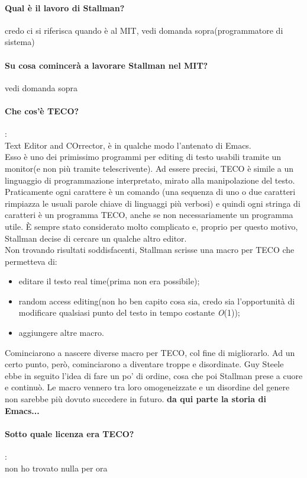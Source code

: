 \documentclass[a4paper]{article}
\begin{document}
		\paragraph{Qual è il lavoro di Stallman?}
		credo ci si riferisca quando è al MIT, vedi domanda sopra(programmatore di sistema)
		\paragraph{Su cosa comincerà a lavorare Stallman nel MIT?}
		vedi domanda sopra
		\paragraph{Che cos'è TECO?}: \\
		Text Editor and COrrector, è in qualche modo l'antenato di Emacs.\\
		Esso è uno dei primissimo programmi per editing di testo usabili tramite un monitor(e non più tramite telescrivente). Ad essere precisi, TECO è simile a un linguaggio di programmazione interpretato, mirato alla manipolazione del testo. Praticamente ogni carattere è un comando (una sequenza di uno o due caratteri rimpiazza le usuali parole chiave di linguaggi più verbosi) e quindi ogni stringa di caratteri è un programma TECO, anche se non necessariamente un programma utile. È sempre stato considerato molto complicato e, proprio per questo motivo, Stallman decise di cercare un qualche altro editor. \\
		Non trovando risultati soddisfacenti, Stallman scrisse una macro per TECO che permetteva di:
		\begin{itemize}
			\item editare il testo real time(prima non era possibile);
			\item random access editing(non ho ben capito cosa sia, credo sia l'opportunità di modificare qualsiasi punto del testo in tempo costante \textit{O}(1));
			\item aggiungere altre macro.
		\end{itemize}
		Cominciarono a nascere diverse macro per TECO, col fine di migliorarlo.
		Ad un certo punto, però, cominciarono a diventare troppe e disordinate. Guy Steele ebbe in seguito l'idea di fare un po' di ordine, cosa che poi Stallman prese a cuore e continuò. Le macro vennero tra loro omogeneizzate e un disordine del genere non sarebbe più dovuto succedere in futuro. \textbf{da qui parte la storia di Emacs...}
	
		\paragraph{Sotto quale licenza era TECO?}:\\
		non ho trovato nulla per ora
	
\end{document}
